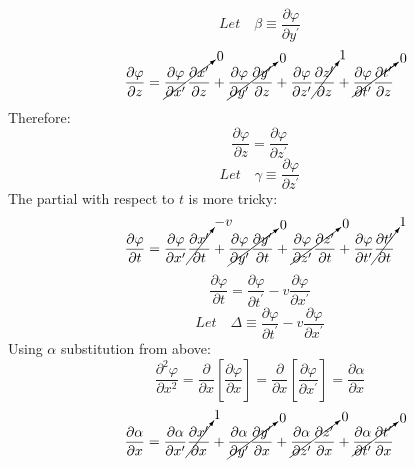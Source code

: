 \documentclass[journal]{IEEEtran}
\begin{document}
\begin{equation}
\boxed{
Let \quad \beta\equiv\frac{\partial\varphi}{\partial y^\prime}}
\end{equation}
\begin{equation}
\frac{\partial\varphi}{\partial z}=
\cancelto{0}{\frac{\partial\varphi}{\partial x^\prime}
\frac{\partial x^\prime}{\partial z}} +
\cancelto{0}{\frac{\partial\varphi}{\partial y^\prime}
\frac{\partial y^\prime}{\partial z}} +
\frac{\partial\varphi}{\partial z^\prime}
\cancelto{1}{\frac{\partial z^\prime}{\partial z}} +
\cancelto{0}{\frac{\partial\varphi}{\partial t^\prime}
\frac{\partial t^\prime}{\partial z}}
\end{equation}
Therefore:
\begin{equation}
\boxed{
\frac{\partial\varphi}{\partial z} = 
\frac{\partial\varphi}{\partial z^\prime}}
\end{equation}
\begin{equation}
\boxed{
Let \quad \gamma\equiv\frac{\partial\varphi}{\partial z^\prime}}
\end{equation}
The partial with respect to $t$ is more tricky:
\begin{equation}
\frac{\partial\varphi}{\partial t}=
\frac{\partial\varphi}{\partial x^\prime}
\cancelto{-v}{\frac{\partial x^\prime}{\partial t}} +
\cancelto{0}{\frac{\partial\varphi}{\partial y^\prime}
\frac{\partial y^\prime}{\partial t}} +
\cancelto{0}{\frac{\partial\varphi}{\partial z^\prime}
\frac{\partial z^\prime}{\partial t}} +
\frac{\partial\varphi}{\partial t^\prime}
\cancelto{1}{\frac{\partial t^\prime}{\partial t}}
\end{equation}
\begin{equation}
\boxed{
\frac{\partial\varphi}{\partial t} = 
\frac{\partial\varphi}{\partial t^\prime} - v\frac{\partial\varphi}
{\partial x^\prime}}
\end{equation}
\begin{equation}
\boxed{
Let \quad \Delta\equiv\frac{\partial\varphi}{\partial t^\prime} -
v\frac{\partial\varphi}{\partial x^\prime}}
\end{equation}
Using \underline{ $\alpha$} substitution from above:
\begin{equation}
\frac{\partial^2\varphi}{\partial x^2} = \frac{\partial}{\partial x}
\left[\frac{\partial\varphi}{\partial x}\right] =
\frac{\partial}{\partial x}
\left[\frac{\partial\varphi}{\partial x^\prime}\right] =
\frac{\partial\alpha}{\partial x}
\end{equation}
\begin{equation}
\frac{\partial\alpha}{\partial x} =
\frac{\partial\alpha}{\partial x^\prime}
\cancelto{1}{\frac{\partial x^\prime}{\partial x}} +
\cancelto{0}{\frac{\partial\alpha}{\partial y^\prime}
\frac{\partial y^\prime}{\partial x}} +
\cancelto{0}{\frac{\partial\alpha}{\partial z^\prime}
\frac{\partial z^\prime}{\partial x}} +
\cancelto{0}{\frac{\partial\alpha}{\partial t^\prime}
\frac{\partial t^\prime}{\partial x}}
\end{equation}
\end{document}
